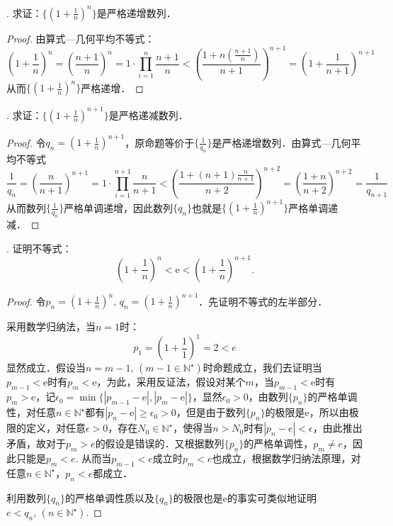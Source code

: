 . 求证：$\displaystyle \{ (1+\frac{1}{n})^n \}$是严格递增数列．
\begin{proof}
由算式---几何平均不等式：
\begin{equation}
(1+\frac{1}{n})^n = (\frac{n+1}{n})^n = 1 \cdot \prod_{i=1}^{n} \frac{n+1}{n} < \left( \frac{1 + n(\frac{n+1}{n})}{n+1} \right)^{n+1} = \left( 1 + \frac{1}{n+1} \right)^{n+1}
\end{equation}
从而$\displaystyle \{ (1+\frac{1}{n})^n\}$严格递增．
\end{proof}
. 求证：$\displaystyle \{ (1+\frac{1}{n})^{n+1}\}$是严格递减数列．
\begin{proof}
令$\displaystyle q_n = (1 + \frac{1}{n})^{n+1}$，原命题等价于$\{ \displaystyle \frac{1}{q_n}\}$是严格递增数列．由算式---几何平均不等式
\begin{equation}
    \frac{1}{q_n} = \left( \frac{n}{n+1} \right)^{n+1} = 1 \cdot \prod_{i = 1}^{n+1} \frac{n}{n+1} < \left( \frac{1 + (n+1) \frac{n}{n+1}}{n+2} \right)^{n+2} = \left( \frac{1+n}{n+2}\right)^{n+2} = \frac{1}{q_{n+1}}
\end{equation}
从而数列$\{ \displaystyle \frac{1}{q_n} \}$严格单调递增，因此数列$\{ q_n \}$也就是$\{ \displaystyle (1 + \frac{1}{n})^{n+1}\}$严格单调递减．
\end{proof}
. 证明不等式：
\begin{equation}
    \left( 1+\frac{1}{n} \right)^n < \mathrm{e} < \left( 1 + \frac{1}{n} \right)^{n+1}.
\end{equation}
\begin{proof}
令$\displaystyle p_n = \left( 1+\frac{1}{n} \right)^n, \, q_n = \left( 1+\frac{1}{n} \right)^{n+1}$．先证明不等式的左半部分．

\noindent 采用数学归纳法，当$n=1$时：
\begin{equation}
    p_1 = (1+\frac{1}{1})^1 = 2 < e
\end{equation}
显然成立．假设当$n=m-1, \, (m-1 \in \mathbb{N}^\star)$时命题成立，我们去证明当$p_{m-1} < \mathrm{e}$时有$p_m < \mathrm{e}$，为此，采用反证法，假设对某个$m$，当$p_{m-1} < \mathrm{e}$时有$p_m > \mathrm{e}$，记$\epsilon_0 = \min \{ |p_{m-1} - \mathrm{e}|, |p_m - \mathrm{e}| \}$，显然$\epsilon_0 > 0$，由数列$\{ p_n \}$的严格单调性，对任意$n \in \mathbb{N}^\star$都有$|p_n - \mathrm{e}| \geq \epsilon_0 > 0$，但是由于数列$\{ p_n \}$的极限是$\mathrm{e}$，所以由极限的定义，对任意$\epsilon > 0$，存在$N_0 \in \mathbb{N}^\star$，使得当$n > N_0$时有$|p_n - e| < \epsilon$，由此推出矛盾，故对于$p_m > e$的假设是错误的．又根据数列$\{ p_n \}$的严格单调性，$p_m \neq e$，因此只能是$p_m < e$. 从而当$p_{m-1} < e$成立时$p_m < e$也成立，根据数学归纳法原理，对任意$n \in \mathbb{N}^\star$，$p_n < e$都成立．

\noindent 利用数列$\{ q_n \}$的严格单调性质以及$\{ q_n \}$的极限也是$\mathrm{e}$的事实可类似地证明$e < q_n, \, (n \in \mathbb{N}^\star)$.
\end{proof}
